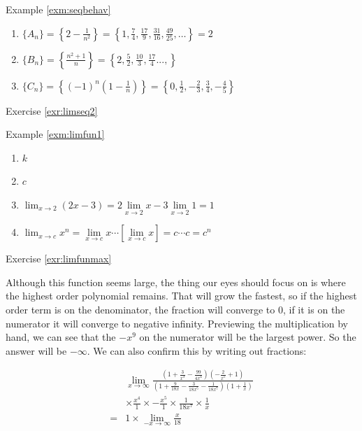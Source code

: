 \documentclass[]{book}
\providecommand{\tightlist}{%
  \setlength{\itemsep}{0pt}\setlength{\parskip}{0pt}}
\theoremstyle{definition}
\theoremstyle{definition}
\theoremstyle{definition}
\theoremstyle{remark}
\let\BeginKnitrBlock\begin \let\EndKnitrBlock\end
\begin{document}
Example \ref{exm:seqbehav}

\BeginKnitrBlock{solution}
{}

\begin{enumerate}
\def\labelenumi{\arabic{enumi}.}
\tightlist
\item
  \(\{A_n\}=\left\{ 2-\frac{1}{n^2} \right\} = \left\{1, \frac{7}{4}, \frac{17}{9}, \frac{31}{16}, \frac{49}{25}, \ldots\right\} = 2\)
\item
  \(\{B_n\}=\left\{\frac{n^2+1}{n} \right\} = \left\{2, \frac{5}{2}, \frac{10}{3}, \frac{17}{4}..., \right\}\)
\item
  \(\{C_n\}=\left\{(-1)^n \left(1-\frac{1}{n}\right) \right\} = \left\{0, \frac{1}{2}, -\frac{2}{3}, \frac{3}{4}, -\frac{4}{5}\right\}\)
\end{enumerate}
\EndKnitrBlock{solution}

Exercise \ref{exr:limseq2}

Example \ref{exm:limfun1}

\BeginKnitrBlock{solution}
{}

\begin{enumerate}
\def\labelenumi{\arabic{enumi}.}
\tightlist
\item
  \(k\)
\item
  \(c\)
\item
  \(\lim_{x\to 2} (2x-3) = 2\lim\limits_{x\to 2} x - 3\lim\limits_{x\to 2} 1 = 1\)
\item
  \(\lim_{x \to c} x^n = \lim\limits_{x \to c} x \cdots[\lim\limits_{x \to c} x] = c\cdots c =c^n\)
\end{enumerate}
\EndKnitrBlock{solution}

Exercise \ref{exr:limfunmax}

\BeginKnitrBlock{solution}
{}Although this function seems large, the thing our eyes should focus on is where the highest order polynomial remains. That will grow the fastest, so if the highest order term is on the denominator, the fraction will converge to 0, if it is on the numerator it will converge to negative infinity. Previewing the multiplication by hand, we can see that the \(-x^9\) on the numerator will be the largest power. So the answer will be \(-\infty\). We can also confirm this by writing out fractions:

\begin{align*}  
& \lim_{x\to\infty}\frac{\left(1 + \frac{3}{x^3} - \frac{99}{4x^4}\right)\left(-\frac{2}{x^5} + 1\right)}{\left(1 + \frac{9}{18x} - \frac{3}{18x^5} - \frac{1}{18x^7} \right)\left(1 + \frac{1}{x}\right)} \\
&\times \frac{x^4}{1} \times -\frac{x^5}{1} \times \frac{1}{18x^7}\times \frac{1}{x}\\
=& 1 \times \lim_{-x\to\infty} \frac{x}{18}
\end{align*}
\EndKnitrBlock{solution}
\end{document}
